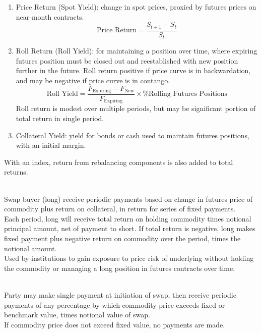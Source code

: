 \begin{remark} 
\begin{enumerate}[label=\roman*.]
\setlength{\itemsep}{0pt}
\item Price Return (Spot Yield): change in spot prices, proxied by futures prices on near-month contracts.
\begin{equation}
\text{Price Return} = \frac{S_{t+1} - S_{t}}{S_{t}} \nonumber
\end{equation}
\item Roll Return (Roll Yield): for maintaining a position over time, where expiring futures position must be closed out and reestablished with new position further in the future. Roll return positive if price curve is in backwardation, and may be negative if price curve is in contango.
\begin{equation}
\text{Roll Yield} = \frac{F_{\text{Expiring}} - F_{\text{New}}}{F_{\text{Expiring}}} \times \text{\% Rolling Futures Positions} \nonumber
\end{equation}
Roll return is modest over multiple periods, but may be significant portion of total return in single period.
\item Collateral Yield: yield for bonds or cash used to maintain futures positions, with an initial margin. 
\end{enumerate}
With an index, return from rebalancing components is also added to total returns.
\end{remark}

\begin{remark} \\
Swap buyer (long) receive periodic payments based on change in futures price of commodity plus return on collateral, in return for series of fixed payments.\\
Each period, long will receive total return on holding commodity times notional principal amount, net of payment to short. If total return is negative, long makes fixed payment plus negative return on commodity over the period, times the notional amount.\\
Used by institutions to gain exposure to price risk of underlying without holding the commodity or managing a long position in futures contracts over time.
\end{remark}

\begin{remark} \\
Party may make single payment at initiation of swap, then receive periodic payments of any percentage by which commodity price exceeds fixed or benchmark value, times notional value of swap.\\
If commodity price does not exceed fixed value, no payments are made.
\end{remark}

